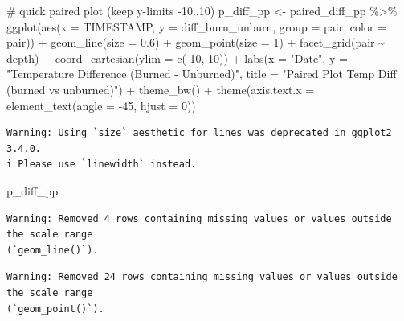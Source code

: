 \documentclass[
  letterpaper,
  DIV=11,
  numbers=noendperiod]{scrartcl}
\newenvironment{Shaded}{\begin{snugshade}}{\end{snugshade}}
\newcommand{\AttributeTok}[1]{\textcolor[rgb]{0.40,0.45,0.13}{#1}}
\newcommand{\CommentTok}[1]{\textcolor[rgb]{0.37,0.37,0.37}{#1}}
\newcommand{\DecValTok}[1]{\textcolor[rgb]{0.68,0.00,0.00}{#1}}
\newcommand{\FloatTok}[1]{\textcolor[rgb]{0.68,0.00,0.00}{#1}}
\newcommand{\FunctionTok}[1]{\textcolor[rgb]{0.28,0.35,0.67}{#1}}
\newcommand{\NormalTok}[1]{\textcolor[rgb]{0.00,0.23,0.31}{#1}}
\newcommand{\OtherTok}[1]{\textcolor[rgb]{0.00,0.23,0.31}{#1}}
\newcommand{\SpecialCharTok}[1]{\textcolor[rgb]{0.37,0.37,0.37}{#1}}
\newcommand{\StringTok}[1]{\textcolor[rgb]{0.13,0.47,0.30}{#1}}
\begin{document}
\begin{Shaded}
\begin{Highlighting}[]
\CommentTok{\# quick paired plot (keep y{-}limits {-}10..10)}
\NormalTok{p\_diff\_pp }\OtherTok{\textless{}{-}}\NormalTok{ paired\_diff\_pp }\SpecialCharTok{\%\textgreater{}\%}
  \FunctionTok{ggplot}\NormalTok{(}\FunctionTok{aes}\NormalTok{(}\AttributeTok{x =}\NormalTok{ TIMESTAMP, }\AttributeTok{y =}\NormalTok{ diff\_burn\_unburn, }\AttributeTok{group =}\NormalTok{ pair, }\AttributeTok{color =}\NormalTok{ pair)) }\SpecialCharTok{+}
  \FunctionTok{geom\_line}\NormalTok{(}\AttributeTok{size =} \FloatTok{0.6}\NormalTok{) }\SpecialCharTok{+}
  \FunctionTok{geom\_point}\NormalTok{(}\AttributeTok{size =} \DecValTok{1}\NormalTok{) }\SpecialCharTok{+}
  \FunctionTok{facet\_grid}\NormalTok{(pair }\SpecialCharTok{\textasciitilde{}}\NormalTok{ depth) }\SpecialCharTok{+}
  \FunctionTok{coord\_cartesian}\NormalTok{(}\AttributeTok{ylim =} \FunctionTok{c}\NormalTok{(}\SpecialCharTok{{-}}\DecValTok{10}\NormalTok{, }\DecValTok{10}\NormalTok{)) }\SpecialCharTok{+}
  \FunctionTok{labs}\NormalTok{(}\AttributeTok{x =} \StringTok{"Date"}\NormalTok{, }\AttributeTok{y =} \StringTok{"Temperature Difference (Burned {-} Unburned)"}\NormalTok{, }\AttributeTok{title =} \StringTok{"Paired Plot Temp Diff (burned vs unburned)"}\NormalTok{) }\SpecialCharTok{+}
  \FunctionTok{theme\_bw}\NormalTok{() }\SpecialCharTok{+}
  \FunctionTok{theme}\NormalTok{(}\AttributeTok{axis.text.x =} \FunctionTok{element\_text}\NormalTok{(}\AttributeTok{angle =} \SpecialCharTok{{-}}\DecValTok{45}\NormalTok{, }\AttributeTok{hjust =} \DecValTok{0}\NormalTok{))}
\end{Highlighting}
\end{Shaded}

\begin{verbatim}
Warning: Using `size` aesthetic for lines was deprecated in ggplot2 3.4.0.
i Please use `linewidth` instead.
\end{verbatim}

\begin{Shaded}
\begin{Highlighting}[]
\NormalTok{p\_diff\_pp}
\end{Highlighting}
\end{Shaded}

\begin{verbatim}
Warning: Removed 4 rows containing missing values or values outside the scale range
(`geom_line()`).
\end{verbatim}

\begin{verbatim}
Warning: Removed 24 rows containing missing values or values outside the scale range
(`geom_point()`).
\end{verbatim}
\end{document}
